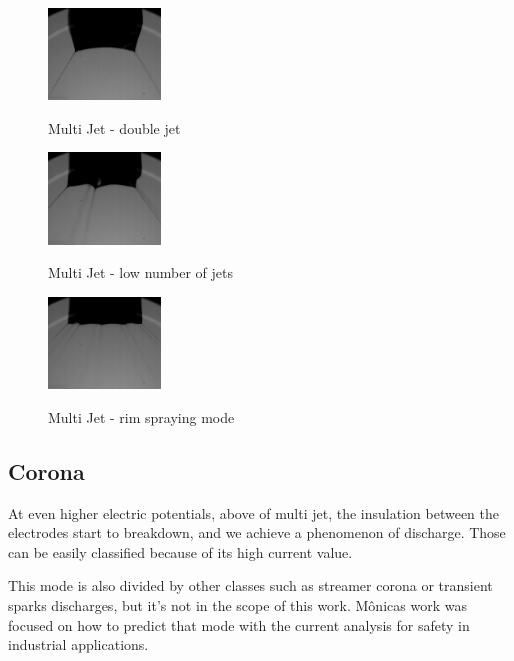 \begin{multicols}{3}

  \begin{figure}[H]
      \center
      \includegraphics[width=3cm]{Figuras/april/multi2.png}
      \label{fig:multijt1}
      \caption{Multi Jet - double jet}
  \end{figure}


  \begin{figure}[H]
      \center
      \includegraphics[width=3cm]{Figuras/april/multi1.png}
      \label{fig:multijt2}
      \caption{Multi Jet - low number of jets}
  \end{figure}


  \begin{figure}[H]
      \center
      \includegraphics[width=3cm]{Figuras/april/multi3.png}
      \label{fig:multijt3}
      \caption{Multi Jet - rim spraying mode}
  \end{figure}

\end{multicols}


\subsection{Corona}
\label{subsec:Corona}

At even higher electric potentials, above of multi jet, the insulation between the electrodes start to breakdown, and we achieve a phenomenon of discharge.
Those can be easily classified because of its high current value. 

This mode is also divided by other classes such as streamer corona or transient sparks discharges, but it's not in the scope of this work. 
Mônicas\cite{Monica} work was focused on how to predict that mode with the current analysis for safety in industrial applications.



\clearpage